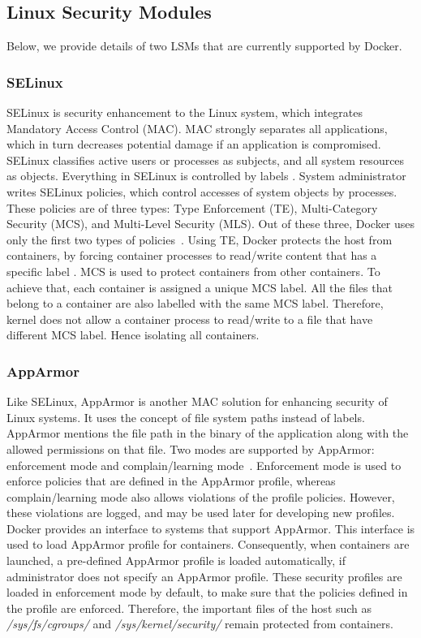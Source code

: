 \subsection{Linux Security Modules}

Below, we provide details of two LSMs that are currently
supported by Docker.

\subsubsection{SELinux}

SELinux is security enhancement to the Linux system, which
integrates Mandatory Access Control (MAC). MAC strongly separates
all applications, which in turn decreases potential damage if an
application is compromised. SELinux classifies active users or
processes as subjects, and all system resources as objects.
Everything in SELinux is controlled by labels
\cite{smalley2001implementing}. System administrator writes
SELinux policies, which control accesses of system objects
by processes. These policies are of three types: Type
Enforcement (TE), Multi-Category Security (MCS), and Multi-Level
Security (MLS). Out of these three, Docker
uses only the first two types of policies~\cite{bui2015analysis}. Using TE,
Docker protects the host from containers,
by forcing container processes to read/write content
that has a specific label \cite{bui2015analysis}.
MCS is used to protect containers from
other containers. To achieve that, each container is
assigned a unique MCS label. All the files that belong to a
container are also labelled with the same MCS label.
Therefore, kernel does not allow a container process to read/write to a file
that have different MCS label. Hence isolating all containers.

\subsubsection{AppArmor}

Like SELinux, AppArmor is another MAC solution
for enhancing security of Linux systems. It uses
the concept of file system paths instead of labels.
AppArmor mentions the file path in the binary of
the application along with the allowed permissions
on that file. Two modes are supported by AppArmor:
enforcement mode and complain/learning mode~\cite{bui2015analysis}.
Enforcement mode is used to enforce policies that are
defined in the AppArmor profile, whereas complain/learning
mode also allows violations of the profile policies.
However, these violations are logged, and may be used later for
developing new profiles. Docker provides an interface to systems
that support AppArmor. This interface is used to load
AppArmor profile for containers. Consequently, when
containers are launched, a pre-defined AppArmor profile is
loaded automatically, if administrator does not specify
an AppArmor profile. These security profiles are loaded in
enforcement mode by default, to make sure that the policies
defined in the profile are enforced. Therefore, the
important files of the host such as \textit{/sys/fs/cgroups/}
and \textit{/sys/kernel/security/} remain protected from
containers.



